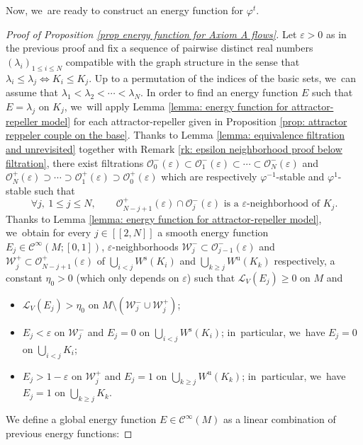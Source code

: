 \documentclass[11pt]{article}
\newcommand{\lcr}{[\![}
\newcommand{\rcr}{]\!]}
\newcommand{\rs}{\mathrm{s}}
\newcommand{\ru}{\mathrm{u}}
\theoremstyle{definition}
\theoremstyle{plain}
\newcommand{\Ccal}{\mathcal{C}}
\newcommand{\Lie}{\mathcal{L}}
\newcommand{\Ocal}{\mathcal{O}}
\newcommand{\Wcal}{\mathcal{W}}
\begin{document}
Now, we~are ready to construct an energy function for $\varphi^t$.

\begin{proof}[Proof of Proposition \ref{prop energy function for Axiom A flows}]
Let $\varepsilon > 0$ as in the previous proof and fix a sequence of pairwise distinct real numbers $(\lambda_i)_{1 \leq i \leq N}$ compatible with the graph structure in the sense that $\lambda_i \leq \lambda_j \Leftrightarrow K_i \leq K_j$. Up to a permutation of the indices of the basic sets, we~can assume that $\lambda_1 < \lambda_2 < \cdots < \lambda_N$.
In order to find an energy function $E$ such that $E = \lambda_j$ on $K_j$, we~will apply Lemma \ref{lemma: energy function for attractor-repeller model} for each attractor-repeller given in Proposition \ref{prop: attractor reppeler couple on the base}. Thanks to Lemma \ref{lemma: equivalence filtration and unrevisited} together with Remark \ref{rk: epsilon neighborhood proof below filtration}, there exist filtrations $\Ocal_0^- (\varepsilon) \subset \Ocal_1^- (\varepsilon) \subset \cdots \subset \Ocal_{N}^- (\varepsilon)$ and $\Ocal_N^+ (\varepsilon) \supset \cdots \supset \Ocal_{1}^+ (\varepsilon) \supset \Ocal_0^+ (\varepsilon)$ which are respectively $\varphi^{-1}$-stable and $\varphi^{1}$-stable such that
\[
\forall j,\ 1 \leq j \leq N, \qquad \Ocal_{N-j+1}^+ (\varepsilon) \cap \Ocal_{j}^- (\varepsilon) \text{ is a } \varepsilon \text{-neighborhood of } K_j.
\]
Thanks to Lemma \ref{lemma: energy function for attractor-repeller model}, we~obtain for every $j\in\lcr2,N\rcr$ a smooth energy function $E_{j} \in \Ccal^{\infty} (M; [0,1])$, $\varepsilon$-neighborhoods $\Wcal_{j}^- \subset \Ocal_{j-1}^- (\varepsilon)$ and $\Wcal_{j}^+ \subset \Ocal_{N-j+1}^+ (\varepsilon)$ of $ \bigcup_{i < j} W^\rs (K_i)$ and $ \bigcup_{k \geq j} W^\ru (K_k)$ respectively, a constant $\eta_0 > 0$ (which only depends on $\varepsilon$) such that $\Lie_V (E_j) \geq 0$ on $M$ and
\begin{itemize}
\item $\Lie_V (E_j) > \eta_0$ on $M\setminus (\Wcal_j^- \cup \Wcal_j^+)$;
\item $E_j < \varepsilon$ on $\Wcal_j^-$ and $E_j = 0$ on $\bigcup_{i < j} W^\rs (K_i)$; in~particular, we~have $E_j = 0$ on $\bigcup_{i < j} K_i$;
\item $E_j > 1 - \varepsilon$ on $\Wcal_j^+$ and $E_j = 1$ on $\bigcup_{k \geq j} W^\ru (K_k)$; in~particular, we~have $E_j = 1$ on $\bigcup_{k \geq j} K_k$.
\end{itemize}
We define a global energy function $E \in \Ccal^{\infty} (M)$ as a linear combination of previous energy functions:

\end{proof}
\end{document}
